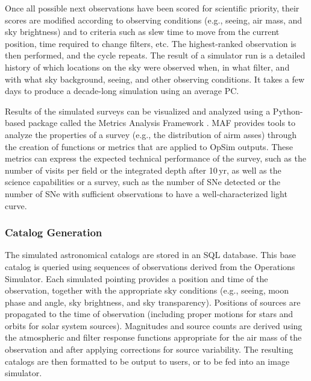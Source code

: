 Once all possible next observations have been scored for scientific
priority, their scores are modified according to observing conditions
(e.g., seeing, air mass, and sky brightness) and to criteria such as
slew time to move from the current position, time required to
change filters, etc. The highest-ranked observation is then performed,
and the cycle repeats. The result of a simulator run is a detailed
history of which locations on the sky were observed when, in what
filter, and with what sky background, seeing, and other observing
conditions.  It takes a few days to produce a decade-long simulation
using an average PC.

Results of the simulated surveys can be visualized and analyzed using
a Python-based package called the Metrics Analysis Framework
\citep[MAF;][]{2014SPIE.9149E..0BJ}. MAF provides tools to analyze the properties of a
survey (e.g., the distribution of airm asses) through the creation of
functions or metrics that are applied to OpSim outputs. These metrics
can express the expected technical performance of the survey, such as
the number of visits per field or the integrated depth after 10\,yr,
as well as the science capabilities or a survey, such as the number of
SNe detected or the number of SNe with sufficient
observations to have a well-characterized light curve.

\subsubsection{Catalog Generation}
\label{sec:catalogs}

The simulated astronomical catalogs \citep[CatSim;][]{2014SPIE.9150E..14C} are
stored in an SQL database. This base catalog is queried using
sequences of observations derived from the Operations Simulator. Each
simulated pointing provides a position and time of the observation,
together with the appropriate sky conditions (e.g., seeing, moon phase
and angle, sky brightness, and sky transparency). Positions of sources
are propagated to the time of observation (including proper motions
for stars and orbits for solar system sources). Magnitudes and source
counts are derived using the atmospheric and filter response functions
appropriate for the air mass of the observation and after applying
corrections for source variability.  The resulting catalogs are then
formatted to be output to users, or to be fed into an image
simulator.

